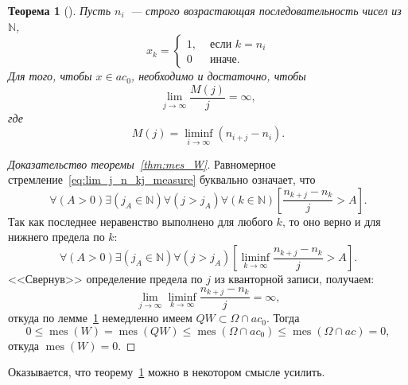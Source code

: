 \documentclass[a4paper,14pt]{article} %
\theoremstyle{plain}
\newtheorem{theorem}[lemma]{Теорема}
\begin{document}
\begin{theorem}[{\cite[Лемма 1]{our-mz2019ac0}}]
	\label{thm:lim_M(j)/j}
	Пусть $n_i$~--- строго возрастающая последовательность чисел из $\mathbb{N}$,
	\begin{equation*}
		x_k = \left\{\begin{array}{ll}
			1, & \mbox{~если~} k = n_i
			\\
			0  & \mbox{~иначе.~}
		\end{array}\right.
	\end{equation*}
	Для того, чтобы $x\in ac_0$,
	необходимо и достаточно, чтобы
	\begin{equation}\label{lim_M(j)/j}
		\lim_{j \to \infty} \frac{M(j)}{j} = \infty
		,
	\end{equation}
	где
	\begin{equation}
		\label{eq:definition_M_j}
		M(j) = \liminf_{i\to\infty} (n_{i+j} - n_i)
		.
	\end{equation}
\end{theorem}


\begin{proof}[Доказательство теоремы~\ref{thm:mes_W}]
	Равномерное стремление~\eqref{eq:lim_j_n_kj_measure}
	буквально означает, что
	\begin{equation}
		\forall(A>0)\exists(j_A\in\mathbb{N})\forall(j > j_A)\forall(k\in\mathbb{N})
		\left[
			\frac{n_{k+j}-n_k}{j}>A
		\right]
		.
	\end{equation}
	Так как последнее неравенство выполнено для любого $k$,
	то оно верно и для нижнего предела по $k$:
	\begin{equation}
		\forall(A>0)\exists(j_A\in\mathbb{N})\forall(j > j_A)
		\left[
			\liminf_{k\to\infty}\frac{n_{k+j}-n_k}{j}>A
		\right]
		.
	\end{equation}
	<<Свернув>> определение предела по $j$ из кванторной записи, получаем:
	\begin{equation}
		\lim_{j\to\infty}\liminf_{k\to\infty}\frac{n_{k+j}-n_k}{j} = \infty
		,
	\end{equation}
	откуда по лемме~\ref{thm:lim_M(j)/j} немедленно имеем $QW \subset \Omega\cap ac_0$.
	Тогда
	\begin{equation}
		0 \leq \operatorname{mes}(W) = \operatorname{mes}(QW) \leq \operatorname{mes}(\Omega\cap ac_0) \leq \operatorname{mes}(\Omega\cap ac) = 0
		,
	\end{equation}
	откуда $\operatorname{mes}(W)=0$.
\end{proof}

Оказывается, что теорему~\ref{thm:lim_M(j)/j} можно в некотором смысле усилить.
\end{document}
